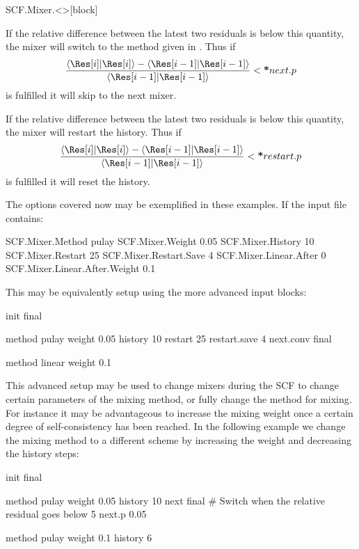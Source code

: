 \begin{fdfentry}{SCF.Mixer.<>}[block]
\begin{fdfoptions}
    \option[next.p]%
    If the relative difference between the latest two residuals is
    below this quantity, the mixer will switch to the method given in
    .
    Thus if
    \begin{equation}
      \frac{\langle \Res[i]|\Res[i]\rangle - \langle
          \Res[i-1]|\Res[i-1]\rangle}%
      {\langle \Res[i-1]|\Res[i-1]\rangle} <
      \fdf*{next.p}
    \end{equation}
    is fulfilled it will skip to the next mixer.

    \option[restart.p]%
    If the relative difference between the latest two residuals is
    below this quantity, the mixer will restart the history.
    Thus if
    \begin{equation}
      \frac{\langle \Res[i]|\Res[i]\rangle - \langle
          \Res[i-1]|\Res[i-1]\rangle}%
      {\langle \Res[i-1]|\Res[i-1]\rangle} <
      \fdf*{restart.p}
    \end{equation}
    is fulfilled it will reset the history.
    
  \end{fdfoptions}
    
\end{fdfentry}


The options covered now may be exemplified in these examples. If the
input file contains:
\begin{fdfexample}
  SCF.Mixer.Method pulay
  SCF.Mixer.Weight 0.05
  SCF.Mixer.History 10
  SCF.Mixer.Restart 25
  SCF.Mixer.Restart.Save 4
  SCF.Mixer.Linear.After 0
  SCF.Mixer.Linear.After.Weight 0.1
\end{fdfexample}

This may be equivalently setup using the more advanced input blocks:
\begin{fdfexample}
    init
    final

     method pulay
     weight 0.05
     history 10
     restart 25
     restart.save 4
     next.conv final

     method linear
     weight 0.1
\end{fdfexample}

This advanced setup may be used to change mixers during the SCF to
change certain parameters of the mixing method, or fully change the
method for mixing. For instance it may be advantageous to increase the
mixing weight once a certain degree of self-consistency has been
reached. In the following example we change the mixing method to a
different scheme by increasing the weight and decreasing the history steps:
\begin{fdfexample}
    init
    final

     method pulay
     weight 0.05
     history 10
     next final
     # Switch when the relative residual goes below 5%
     next.p 0.05

     method pulay
     weight 0.1
     history 6
\end{fdfexample}

